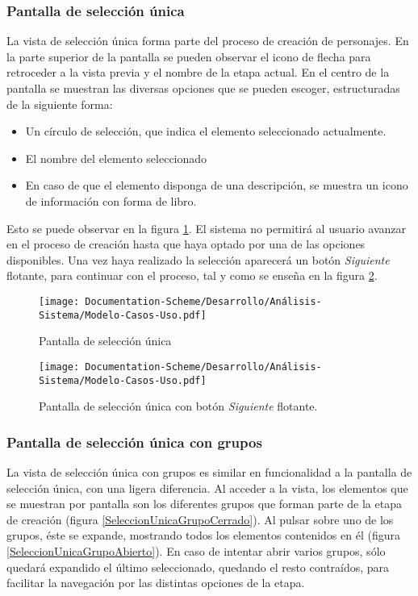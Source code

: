 \subsubsection{Pantalla de selección única}
La vista de selección única forma parte del proceso de creación de personajes. En la parte superior de la 
pantalla se pueden observar el icono de flecha para retroceder a la vista previa y el nombre de la etapa actual.
En el centro de la pantalla se muestran las diversas opciones que se pueden escoger, estructuradas de la siguiente forma:
\begin{itemize}
    \item Un círculo de selección, que indica el elemento seleccionado actualmente.
    \item El nombre del elemento seleccionado
    \item En caso de que el elemento disponga de una descripción, se muestra un icono de información con forma de libro.
\end{itemize}
Esto se puede observar en la figura \ref*{SeleccionUnica}. El sistema no permitirá al usuario avanzar en el proceso de creación 
hasta que haya optado por una de las opciones disponibles. Una vez haya realizado la selección aparecerá un botón \textit{Siguiente}
flotante, para continuar con el proceso, tal y como se enseña en la figura \ref*{Siguiente}.

\begin{figure}[H]
    \centering
    \texttt{[image: Documentation-Scheme/Desarrollo/Análisis-Sistema/Modelo-Casos-Uso.pdf]}
    \caption{Pantalla de selección única}
    \label{SeleccionUnica}    
\end{figure}

\begin{figure}[H]
    \centering
    \texttt{[image: Documentation-Scheme/Desarrollo/Análisis-Sistema/Modelo-Casos-Uso.pdf]}
    \caption{Pantalla de selección única con botón \textit{Siguiente} flotante.}
    \label{Siguiente}    
\end{figure}

\subsubsection{Pantalla de selección única con grupos}
La vista de selección única con grupos es similar en funcionalidad a la pantalla de selección única, con una ligera diferencia.
Al acceder a la vista, los elementos que se muestran por pantalla son los diferentes grupos que forman parte de la etapa de creación
(figura \ref*{SeleccionUnicaGrupoCerrado}). Al pulsar sobre uno de los grupos, éste se expande, mostrando todos los elementos 
contenidos en él (figura \ref*{SeleccionUnicaGrupoAbierto}). En caso de intentar abrir varios grupos, sólo quedará expandido 
el último seleccionado, quedando el resto contraídos, para facilitar la navegación por las distintas opciones de la etapa.

